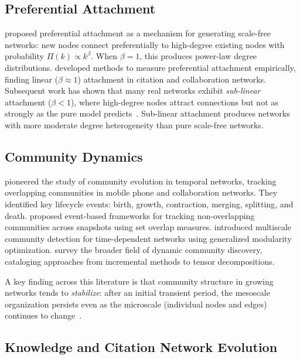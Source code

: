 \documentclass[10pt,letterpaper]{article}
\begin{document}
\subsection{Preferential Attachment}

\citet{barabasi1999emergence} proposed preferential attachment as a mechanism for generating scale-free networks: new nodes connect preferentially to high-degree existing nodes with probability $\Pi(k) \propto k^\beta$. When $\beta = 1$, this produces power-law degree distributions. \citet{jeong2003measuring} developed methods to measure preferential attachment empirically, finding linear ($\beta \approx 1$) attachment in citation and collaboration networks. Subsequent work has shown that many real networks exhibit \emph{sub-linear} attachment ($\beta < 1$), where high-degree nodes attract connections but not as strongly as the pure model predicts~\citep{newman2001clustering}. Sub-linear attachment produces networks with more moderate degree heterogeneity than pure scale-free networks.

\subsection{Community Dynamics}

\citet{palla2007quantifying} pioneered the study of community evolution in temporal networks, tracking overlapping communities in mobile phone and collaboration networks. They identified key lifecycle events: birth, growth, contraction, merging, splitting, and death. \citet{greene2010tracking} proposed event-based frameworks for tracking non-overlapping communities across snapshots using set overlap measures. \citet{mucha2010community} introduced multiscale community detection for time-dependent networks using generalized modularity optimization. \citet{rossetti2018community} survey the broader field of dynamic community discovery, cataloging approaches from incremental methods to tensor decompositions.

A key finding across this literature is that community structure in growing networks tends to \emph{stabilize}: after an initial transient period, the mesoscale organization persists even as the microscale (individual nodes and edges) continues to change~\citep{palla2007quantifying}.

\subsection{Knowledge and Citation Network Evolution}
\end{document}
